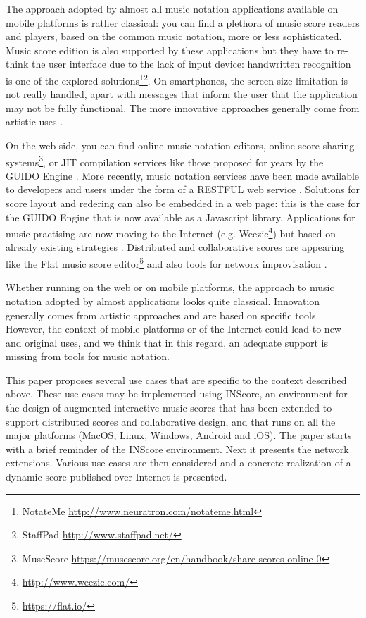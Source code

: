 \documentclass{article}
\begin{document}
The approach adopted by almost all music notation applications available on mobile platforms is rather classical: you can find a plethora of music score readers and players, based on the common music notation, more or less sophisticated. Music score edition is also supported by these applications but they have to re-think the user interface due to the lack of input device: handwritten recognition is one of the explored solutions\footnote{NotateMe \url{http://www.neuratron.com/notateme.html}}\footnote{StaffPad \url{http://www.staffpad.net/}}. On smartphones, the screen size limitation is not really handled, apart with messages that inform the user that the application may not be fully functional. The more innovative approaches  generally come from artistic uses \cite{polashek14a}.

On the web side, you can find online music notation editors, online score sharing systems\footnote{MuseScore \url{https://musescore.org/en/handbook/share-scores-online-0}}, or JIT compilation services like those proposed for years by the GUIDO Engine \cite{renz98}. More recently, music notation services have been made available to developers and users under the form of a RESTFUL web service \cite{solomon:2014a}. Solutions for score layout and redering can also be embedded in a web page: this is the case for the GUIDO Engine \cite{Dau:09b} that is now available as a Javascript library. 
Applications for music practising are now moving to the Internet (e.g. Weezic\footnote{\url{http://www.weezic.com/}}) but based on already existing strategies \cite{SPY05}\cite{Fober:07b}. Distributed and collaborative scores are appearing like the Flat music score editor\footnote{\url{https://flat.io/}} and also tools for network improvisation \cite{canning14a}.

Whether running on the web or on mobile platforms, the approach to music notation adopted by almost applications looks quite classical. Innovation generally comes from artistic approaches and are based on specific tools.
However, the context of mobile platforms or of the Internet could lead to new and original uses, and we think that in this regard, an adequate support is missing from tools for music notation. 

This paper proposes several use cases that are specific to the context described above.
These use cases may be implemented using INScore, an environment for the design of augmented interactive music scores that has been extended to support distributed scores and collaborative design, and that runs on all the major platforms (MacOS, Linux, Windows, Android and iOS). 
The paper starts with a brief reminder of the INScore environment. Next it presents the network extensions. Various use cases are then considered and a concrete realization of a dynamic score published over Internet is presented.
\end{document}
